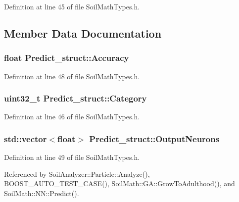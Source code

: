Definition at line 45 of file Soil\+Math\+Types.\+h.



\subsection{Member Data Documentation}
\hypertarget{struct_predict__struct_a587f18ac05cd65437327a54261d1e22c}{}
\subsubsection[{Accuracy}]{\setlength{\rightskip}{0pt plus 5cm}float Predict\+\_\+struct\+::\+Accuracy}\label{struct_predict__struct_a587f18ac05cd65437327a54261d1e22c}


Definition at line 48 of file Soil\+Math\+Types.\+h.

\hypertarget{struct_predict__struct_a9ec8092acf251221ad920454472f734b}{}
\subsubsection[{Category}]{\setlength{\rightskip}{0pt plus 5cm}uint32\+\_\+t Predict\+\_\+struct\+::\+Category}\label{struct_predict__struct_a9ec8092acf251221ad920454472f734b}


Definition at line 46 of file Soil\+Math\+Types.\+h.

\hypertarget{struct_predict__struct_aa0708cae93baa061f21452537e86d3bd}{}
\subsubsection[{Output\+Neurons}]{\setlength{\rightskip}{0pt plus 5cm}std\+::vector$<$float$>$ Predict\+\_\+struct\+::\+Output\+Neurons}\label{struct_predict__struct_aa0708cae93baa061f21452537e86d3bd}


Definition at line 49 of file Soil\+Math\+Types.\+h.



Referenced by Soil\+Analyzer\+::\+Particle\+::\+Analyze(), B\+O\+O\+S\+T\+\_\+\+A\+U\+T\+O\+\_\+\+T\+E\+S\+T\+\_\+\+C\+A\+S\+E(), Soil\+Math\+::\+G\+A\+::\+Grow\+To\+Adulthood(), and Soil\+Math\+::\+N\+N\+::\+Predict().

